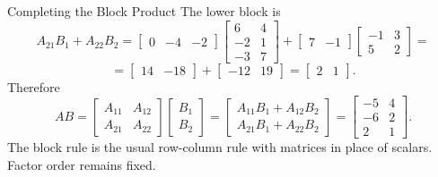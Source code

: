 \begin{frame}{Completing the Block Product}
The lower block is
\[
A_{21}B_1+A_{22}B_2=
\begin{bmatrix}0&-4&-2\end{bmatrix}\begin{bmatrix}6&4\\-2&1\\-3&7\end{bmatrix}+\begin{bmatrix}7&-1\end{bmatrix}\begin{bmatrix}-1&3\\5&2\end{bmatrix}=
\]
\[
=\begin{bmatrix}14&-18\end{bmatrix}+\begin{bmatrix}-12&19\end{bmatrix}=
\begin{bmatrix}2&1\end{bmatrix}.
\]
\pause
Therefore
\[
AB=
\begin{bmatrix}A_{11}&A_{12}\\A_{21}&A_{22}\end{bmatrix}
\begin{bmatrix}B_1\\B_2\end{bmatrix}
=\begin{bmatrix}
A_{11}B_1+A_{12}B_2\\
A_{21}B_1+A_{22}B_2
\end{bmatrix}
=\begin{bmatrix}-5&4\\-6&2\\2&1\end{bmatrix}.
\]
The block rule is the usual row-column rule with matrices in place of scalars. Factor order remains fixed.
\end{frame}

